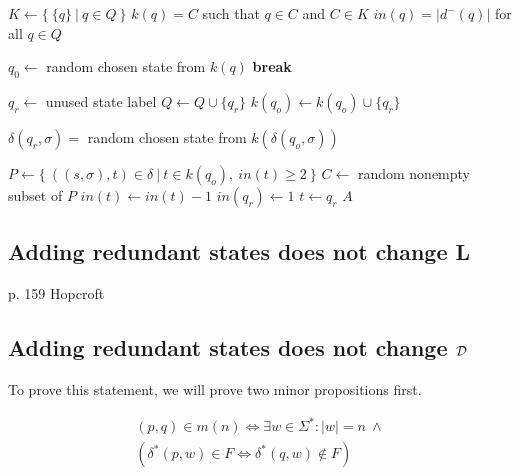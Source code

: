 \vspace{0.2cm}
\begin{spacing}{1}
\begin{algorithmic}[1]
	\State $K \gets \{\ \{q\}\ |\ q \in Q\ \}$ 
	\State $k(q) = C$ such that $q \in C$ and $C \in K$ 
	\State $in(q) = |d^-(q)|$ for all $q \in Q$ 
	
		 
				\State $q_0 \gets$ random chosen state from $k(q)$
				\State \textbf{break}
			\EndIf
		\EndFor
		
		\State $q_r \gets$ unused state label 
		\State $Q \gets Q \cup \{ q_r \}$
		\State $k(q_o) \gets k(q_o) \cup \{q_r\}$
		
		 
			\State $\delta(q_r, \sigma) =$ random chosen state from $k(\delta(q_o, \sigma))$
		\EndFor
		
		\State $P \gets \{\ ((s, \sigma), t) \in \delta\ |\ t \in k(q_o),\ in(t) \geq 2\ \}$ 
		\State $C \gets$ random nonempty subset of $P$
			\State $in(t) \gets in(t) - 1$
			\State $in(q_r) \gets 1$
			\State $t \gets q_r$
		\EndFor
	\EndFor
	\State \Return $A$
	\EndFunction
\end{algorithmic}
\end{spacing}
\vspace{0.2cm}

\subsection{Adding redundant states does not change L}

p. 159 Hopcroft

\subsection{Adding redundant states does not change $\mathcal{D}$}

To prove this statement, we will prove two minor propositions first.

\begin{lemma}[Semantics of $(p,q) \in m(n)$] \label{ch:3:semantics-of-m(n)}
	\begin{multline*}
	(p,q) \in m(n) \Longleftrightarrow 
	\exists w\in\Sigma^*\colon |w| = n\ \land \\
	(\delta^*(p,w) \in F \Leftrightarrow \delta^*(q,w) \notin F)
	\end{multline*}
\end{lemma}

